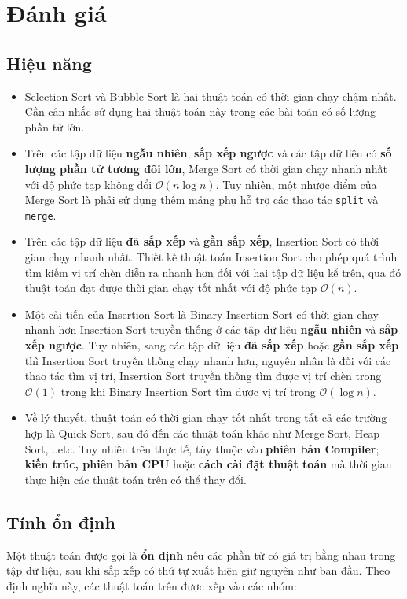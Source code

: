 \documentclass[]{article}
\begin{document}
\section{Đánh giá}
\subsection{Hiệu năng}
\begin{itemize}
\item Selection Sort và Bubble Sort là hai thuật toán có thời gian chạy chậm nhất. Cần cân nhắc sử dụng hai thuật toán này trong các bài toán có số lượng phần tử lớn.
\item Trên các tập dữ liệu \textbf{ngẫu nhiên}, \textbf{sắp xếp ngược} và các tập dữ liệu có \textbf{số lượng phần tử tương đôi lớn}, Merge Sort có thời gian chạy nhanh nhất với độ phức tạp không đổi $\mathcal{O}(n \log n)$. Tuy nhiên, một nhược điểm của Merge Sort là phải sử dụng thêm mảng phụ hỗ trợ các thao tác \texttt{split} và \texttt{merge}.
\item Trên các tập dữ liệu \textbf{đã sắp xếp} và \textbf{gần sắp xếp}, Insertion Sort có thời gian chạy nhanh nhất. Thiết kế thuật toán Insertion Sort cho phép quá trình tìm kiếm vị trí chèn diễn ra nhanh hơn đối với hai tập dữ liệu kể trên, qua đó thuật toán đạt được thời gian chạy tốt nhất với độ phức tạp $\mathcal{O}(n)$.
\item Một cải tiến của Insertion Sort là Binary Insertion Sort có thời gian chạy nhanh hơn Insertion Sort truyền thống ở các tập dữ liệu \textbf{ngẫu nhiên} và \textbf{sắp xếp ngược}. Tuy nhiên, sang các tập dữ liệu \textbf{đã sắp xếp} hoặc \textbf{gần sắp xếp} thì Insertion Sort truyền thống chạy nhanh hơn, nguyên nhân là đối với các thao tác tìm vị trí, Insertion Sort truyền thống tìm được vị trí chèn trong $\mathcal{O}(1)$ trong khi Binary Insertion Sort tìm được vị trí trong $\mathcal{O}(\log n)$.
\item Về lý thuyết, thuật toán có thời gian chạy tốt nhất trong tất cả các trường hợp là Quick Sort, sau đó đến các thuật toán khác như Merge Sort, Heap Sort, ..etc. Tuy nhiên trên thực tế, tùy thuộc vào \textbf{phiên bản Compiler}; \textbf{kiến trúc, phiên bản CPU} hoặc \textbf{cách cài đặt thuật toán} mà thời gian thực hiện các thuật toán trên có thể thay đổi.\cite{liweitang}
\end{itemize}

\subsection{Tính ổn định}
Một thuật toán được gọi là \textbf{ổn định} nếu các phần tử có giá trị bằng nhau trong tập dữ liệu, sau khi sắp xếp có thứ tự xuất hiện giữ nguyên như ban đầu. Theo định nghĩa này, các thuật toán trên được xếp vào các nhóm:
\end{document}
